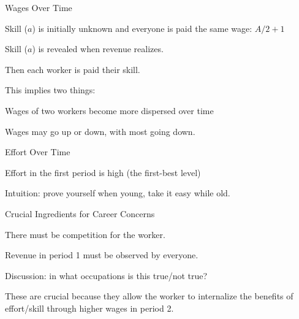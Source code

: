 \documentclass[aspectratio=169,usenames,dvipsnames]{beamer}
\newenvironment{wideitemize}{\itemize\addtolength{\itemsep}{10pt}}{\enditemize}
\begin{document}
\begin{frame}{Wages Over Time}

\begin{wideitemize}
    \item Skill ($a$) is initially unknown and everyone is paid the same wage: $A/2+1$
    \item Skill ($a$) is revealed when revenue realizes.
    \item Then each worker is paid their skill.
    \item This implies two things:
    \begin{wideitemize}
        \item Wages of two workers become more dispersed over time
        \item Wages may go up or down, with most going down.
    \end{wideitemize}
\end{wideitemize}
    
\end{frame}

\begin{frame}{Effort Over Time}

\begin{wideitemize}
    \item Effort in the first period is high (the first-best level)
    \item Intuition: prove yourself when young, take it easy while old.
\end{wideitemize}
    
\end{frame}



\begin{frame}{Crucial Ingredients for Career Concerns}

\begin{wideitemize}
    \item There must be competition for the worker.
    \item Revenue in period 1 must be observed by everyone.
    \item Discussion: in what occupations is this true/not true?
    \item These are crucial because they allow the worker to internalize the benefits of effort/skill through higher wages in period 2.
\end{wideitemize}
    
\end{frame}
\end{document}
